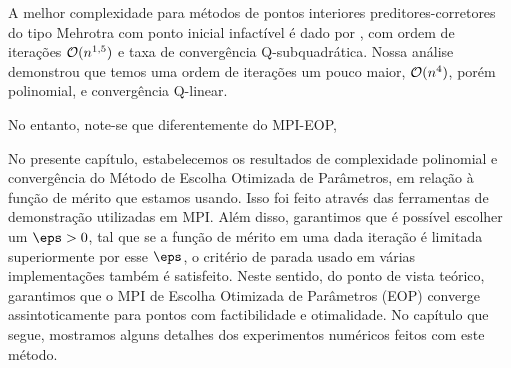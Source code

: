 A melhor complexidade para métodos de pontos interiores preditores-corretores do tipo Mehrotra com ponto inicial infactível é dado por \textcite{Zhang:1996it}, com ordem de iterações $\mathcal{O}(n^{\num{1.5}})$ e taxa de convergência Q-subquadrática. Nossa análise demonstrou que temos uma ordem de iterações um pouco maior, $\mathcal{O}(n^{\num{4}})$, porém polinomial, e convergência Q-linear. 

No entanto, note-se que diferentemente do MPI-EOP, 


No presente capítulo, estabelecemos os resultados de complexidade polinomial e convergência  do Método de Escolha Otimizada de Parâmetros, em relação à função de mérito que estamos usando. Isso foi feito através das ferramentas de demonstração utilizadas em \acl{MPI}. Além disso, garantimos que é possível escolher um $\eps>0$, tal que se a função de mérito em uma dada iteração é limitada superiormente por esse $\eps$, o critério de parada  usado em várias implementações também é satisfeito. Neste sentido, do ponto de vista teórico,  garantimos que o \ac{MPI} de Escolha Otimizada de Parâmetros (EOP) converge assintoticamente para pontos com factibilidade e otimalidade. No capítulo que segue, mostramos alguns detalhes dos experimentos numéricos feitos com este método.


